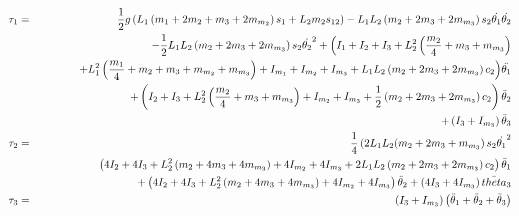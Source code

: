 \documentclass{article}
\begin{document}
\begin{eqnarray*}
	\tau_1 &=& \frac{1}{2} g \left( L_1 \left( m_1 + 2 m_2 + m_3 + 2m_{m_2} \right) s_1 + L_2 m_2 s_{12} \right) - L_1 L_2 \left(m_2 + 2m_3 + 2m_{m_3} \right) s_2 \dot{\theta_1} \dot{\theta_2} \\
	& & \hspace{.5in} - \frac{1}{2} L_1 L_2 \left( m_2 + 2m_3 + 2 m_{m_3} \right) s_2 \dot{\theta_2}^2  + \Big(I_1 + I_2 + I_3 + L_2^2 \left(\frac{m_2}{4} + m_3 + m_{m_3} \right) \\
	& & \hspace{.5in} + L_1^2\left( \frac{m_1}{4} + m_2 + m_3 + m_{m_2} + m_{m_3} \right) + I_{m_1} + I_{m_2} + I_{m_3} + L_1 L_2 \left(m_2 + 2m_3 + 2m_{m_3} \right) c_2 \Big) \ddot{\theta_1} \\
	& & \hspace{.5in} + \left(I_2 + I_3 + L_2^2\left(\frac{m_2}{4} + m_3 + m_{m_3} \right) + I_{m_2} + I_{m_3} + \frac{1}{2}\left(m_2 +2m_3 + 2m_{m_3} \right)c_2 \right)\ddot{\theta}_2 \\
	& & \hspace{.5in} + \left(I_3 + I_{m_3}\right)\ddot{\theta}_3 \\
	\tau_2 &=& \frac{1}{4}\left(2 L_1 L_2 (m_2 + 2 m_3 +  m_{m_3} \right)s_2 \dot{\theta_1}^2 \\
	& & \hspace{.5in} \left(4I_2 + 4I_3 + L_2^2\left(m_2 + 4m_3 + 4m_{m_3} \right) + 4 I_{m_2} + 4 I_{m_3} + 2L_1 L_2 \left(m_2 + 2m_3 + 2m_{m_3} \right)c_2 \right)\ddot{\theta}_1 \\
	& & \hspace{.5in} + \left(4 I_2 + 4 I_3 + L_2^2 \left(m_2 + 4 m_3 + 4 m_{m_3} \right) + 4I_{m_2} + 4I_{m_3} \right)\ddot{\theta}_2 + \left(4I_3 + 4I_{m_3}\right)\ddot{theta}_3 \\
	\tau_3 &=& \left(I_3 + I_{m_3} \right) \left(\ddot{\theta}_1 + \ddot{\theta}_2 + \ddot{\theta}_3 \right)
\end{eqnarray*}
\end{document}

